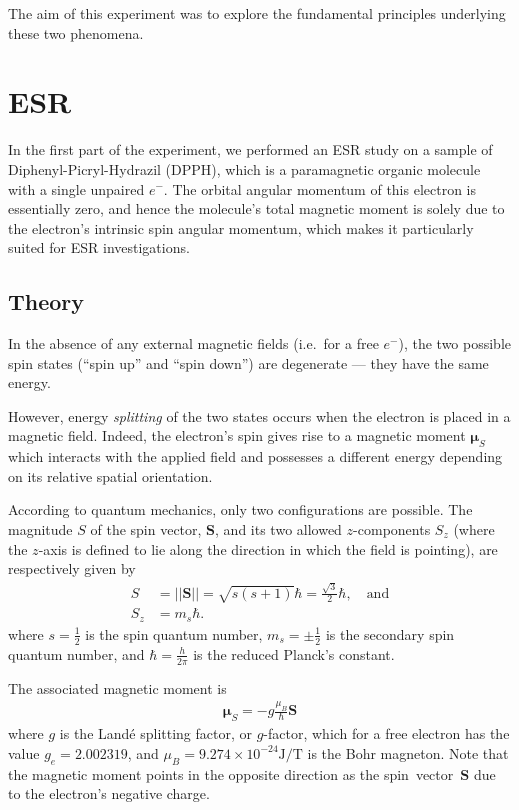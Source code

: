 \documentclass[a4paper]{jpconf}
\numberwithin{equation}{section}
\begin{document}
The aim of this experiment was to explore the fundamental principles underlying these two phenomena.

\section{ESR}
In the first part of the experiment, we performed an ESR study on a sample of Diphenyl-Picryl-Hydrazil (DPPH), which is a paramagnetic organic molecule with a single unpaired $e^-$. The orbital angular momentum of this electron is essentially zero,    %
and hence the molecule\textquoteright s total magnetic moment is solely due to the electron\textquoteright s intrinsic spin angular momentum, which makes it particularly suited for ESR investigations.
 
\subsection{Theory}\label{section: theory}
In the absence of any external magnetic fields (i.e.\ for a free $e^-$), the two possible spin states (``spin up'' and ``spin down'') are degenerate --- they have the same energy.

However, energy \emph{splitting} of the two states occurs when the electron is placed in a magnetic field. Indeed, the electron's spin gives rise to a magnetic moment $\bm{\mu}_S$ which interacts with the applied field and possesses a different energy depending on its relative spatial orientation. 

According to quantum mechanics, only two configurations are possible. The magnitude $S$ of the spin vector, $\mathbf{S}$, and its two allowed $z$-components $S_z$ (where the $z$-axis is defined to lie along the direction in which the field is pointing), are respectively given by
\begin{align}
	S &= \lvert\lvert\mathbf{S}\rvert\rvert = \sqrt{s(s+1)}\hbar = \tfrac{\sqrt{3}}{2}\hbar,  \quad \text{and} \nonumber \\
	S_z &= m_s \hbar. \label{eqn: magnetic moment z-projection}
\end{align}
where $s=\tfrac12$ is the spin quantum number, $m_s=\pm\tfrac12$ is the secondary spin quantum number, and $\hbar = \tfrac{h}{2 \pi}$ is the reduced Planck\textquoteright s constant.

The associated magnetic moment is
\begin{align}
	\bm{\mu}_S = - g \frac{\mu_B}{\hbar} \mathbf{S} \label{eqn: magnetic moment}
\end{align}
where $g$ is the Land\'e splitting factor, or $g$-factor, which for a free electron has the value $g_e = 2.002319$, and $\mu_B = 9.274 \times 10^{-24} \si{\joule\per\tesla}$ is the Bohr magneton. Note that the magnetic moment points in the opposite direction as the spin~vector~$\mathbf{S}$ due to the electron's negative charge.
\end{document}
